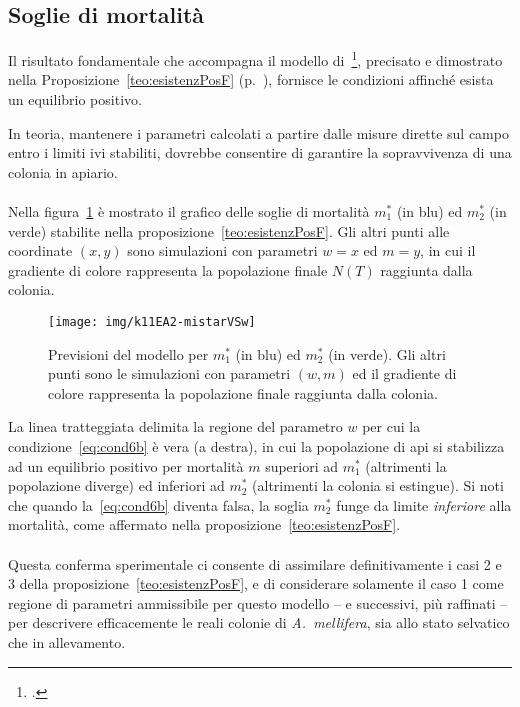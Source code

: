 \subsection{Soglie di mortalità}
\label{ssec:simSoglie}
Il risultato fondamentale che accompagna il modello di~\citeauthor{khoury2011}\footcite{khoury2011},
precisato e dimostrato nella
Proposizione~\ref{teo:esistenzPosF} (p.~\pageref{teo:esistenzPosF}), fornisce le condizioni affinché esista un
equilibrio positivo.

In teoria, mantenere i parametri calcolati a partire dalle misure dirette sul campo
entro i limiti ivi stabiliti, dovrebbe consentire di garantire la sopravvivenza di una colonia in apiario.

\paragraph{}
Nella figura~\ref{img:kh11expA24} è mostrato il grafico delle soglie di mortalità $m_1^*$ (in blu) ed
$m_2^*$ (in verde) stabilite nella proposizione~\ref{teo:esistenzPosF}.
Gli altri punti alle coordinate $(x,y)$ sono simulazioni con parametri $w=x$ ed $m=y$, in cui il gradiente
di colore rappresenta la popolazione finale $N(T)$ raggiunta dalla colonia.

\begin{figure}[!h]
    \centering
    \texttt{[image: img/k11EA2-mistarVSw]}

    \caption[Esperimento A, soglie di mortalità]{Previsioni del modello per $m_1^*$ (in blu) ed $m_2^*$ (in verde).
        Gli altri punti sono le simulazioni con parametri $(w,m)$ ed il gradiente di colore rappresenta la popolazione
        finale raggiunta dalla colonia.
    }

    \label{img:kh11expA24}
\end{figure}

La linea tratteggiata delimita la regione del parametro $w$ per cui la condizione~\eqref{eq:cond6b} è vera (a destra),
in cui la popolazione di api si stabilizza ad un equilibrio positivo per mortalità $m$ superiori ad $m_1^*$
(altrimenti la popolazione diverge) ed inferiori ad $m_2^*$ (altrimenti la colonia si estingue).
Si noti che quando la~\eqref{eq:cond6b} diventa falsa, la soglia $m_2^*$ funge
da limite \emph{inferiore} alla mortalità, come affermato nella proposizione~\ref{teo:esistenzPosF}.

\paragraph{}
Questa conferma sperimentale ci consente di assimilare definitivamente i casi 2 e 3 della
proposizione~\ref{teo:esistenzPosF}, e di considerare solamente il caso 1 come regione di parametri ammissibile
per questo modello -- e successivi, più raffinati -- per descrivere efficacemente le reali colonie di \emph{A.~mellifera},
sia allo stato selvatico che in allevamento.
